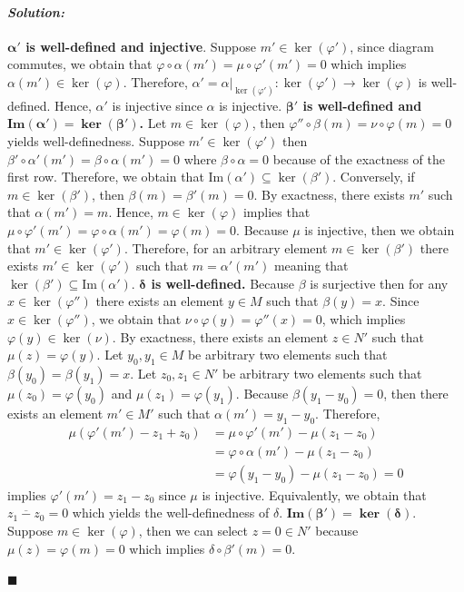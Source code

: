 \documentclass[12pt, a4paper]{article}
\theoremstyle{remark}
\newenvironment{solution}
  {\paragraph{\textit{Solution:}}\par\medskip}
  {\hfill$\blacksquare$\vspace{0.1cm}}
\begin{document}
\begin{solution}
    \textbf{$\bm{\alpha'}$ is well-defined and injective}. Suppose $m'\in\ker(\varphi')$, since diagram commutes, we obtain that $\varphi\circ \alpha(m')=\mu\circ\varphi'(m')=0$ which implies $\alpha(m')\in\ker(\varphi)$. 
    Therefore, $\alpha'= \alpha|_{\ker(\varphi')}:\ker(\varphi')\to \ker(\varphi)$ is well-defined. Hence, $\alpha'$ is injective since $\alpha$ is injective.
    \textbf{$\bm{\beta'}$ is well-defined and $\bm{\textbf{Im}(\alpha')=\ker(\beta')}$.}  Let $m\in\ker(\varphi)$, then $\varphi''\circ\beta(m)=\nu\circ \varphi(m)=0$ yields well-definedness. Suppose $m'\in\ker(\varphi')$ then $\beta'\circ\alpha'(m')=\beta\circ\alpha(m')=0$ where $\beta\circ\alpha=0$ because of 
    the exactness of the first row. Therefore, we obtain that $\text{Im}(\alpha')\subseteq\ker(\beta')$. Conversely, if $m\in\ker(\beta')$, then $\beta(m)=\beta'(m)=0$. By exactness, there exists $m'$ such that $\alpha(m')=m$. Hence, $m\in\ker(\varphi)$ implies that $\mu\circ\varphi'(m')= \varphi\circ\alpha(m')= \varphi(m)=0$. 
    Because $\mu$ is injective, then we obtain that $m'\in\ker(\varphi')$. Therefore, for an arbitrary element $m\in\ker(\beta')$ there exists $m'\in\ker(\varphi')$ such that $m=\alpha'(m')$ meaning that $\ker(\beta')\subseteq\text{Im}(\alpha')$.
    \textbf{$\bm{\delta}$ is well-defined.}
    Because $\beta$ is surjective then for any $x\in \ker(\varphi'')$ there exists an element $y\in M$ such that $\beta(y)=x$.
    Since $x\in\ker(\varphi'')$, we obtain that $\nu\circ\varphi(y)= \varphi''(x)=0$, which implies $\varphi(y)\in\ker(\nu)$. By exactness, 
    there exists an element $z\in N'$ such that $\mu(z)=\varphi(y)$.
    Let $y_0,y_1\in M $ be arbitrary two elements such that $\beta(y_0)=\beta(y_1)=x$. Let $z_0,z_1\in N'$ be arbitrary two elements such that $\mu(z_0)=\varphi(y_0)$ and $\mu(z_1)=\varphi(y_1)$.
    Because $\beta(y_1-y_0)= 0$, then there exists an element $m'\in M'$ such that $\alpha(m')=y_1-y_0$. Therefore, 
    \begin{align*}
        \mu(\varphi'(m')-z_1+z_0)&= \mu\circ \varphi'(m')-\mu(z_1-z_0) \\
        &= \varphi\circ\alpha(m')-\mu(z_1-z_0) \\
        &= \varphi(y_1-y_0) - \mu(z_1-z_0)=0
    \end{align*}
    implies $\varphi'(m')=z_1-z_0$ since $\mu$ is injective. Equivalently, we obtain that $\overline{z_1-z_0}=0$ which yields the well-definedness of $\delta$.
    \textbf{$\bm{\textbf{Im}(\beta')=\ker(\delta)}$}. Suppose $m\in\ker(\varphi)$, then we can select $z=0\in N'$ because $\mu(z)=\varphi(m)=0$ which implies $\delta\circ\beta'(m)=0$.

\end{solution}
\end{document}
